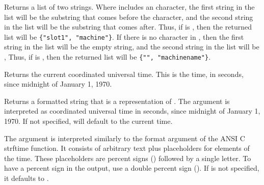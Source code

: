 \begin{description}
  \item[\Code{List splitSlotName(String Name)}]
    Returns a list of two strings.
    Where  includes an  character,
    the first string in the list will be the substring that comes before
    the  character, 
    and the second string in the list will be the substring that comes after.
    Thus, if  is , then the returned list
    will be \verb|{"slot1", "machine"}|.
    If there is no  character in ,
    then the first string in the list will be the empty string,
    and the second string in the list will be , 
    Thus, if  is , then the returned list
    will be \verb|{"", "machinename"}|.

  \item[\Code{Integer time()}]
    Returns the current coordinated universal time.
    This is the time, in seconds, since midnight of January 1, 1970.

  \item[\Code{String formatTime(\Lbr\ Integer time \Rbr\ \Lbr\ , String format \Rbr)}]

    Returns a formatted string that is a representation of .
    The argument  is interpreted as coordinated universal time in
    seconds, since midnight of January 1, 1970. If not specified,
     will default to the current time.
		
    The argument  is interpreted similarly to the format
    argument of the ANSI C strftime function. It consists of arbitrary text
    plus placeholders for elements of the time. These placeholders are
    percent signs (\Percent) followed by a single letter.
    To have a percent sign in
    the output, use a double percent sign (\Percent\Percent).  If
     is not specified, it defaults to .


\end{description}

